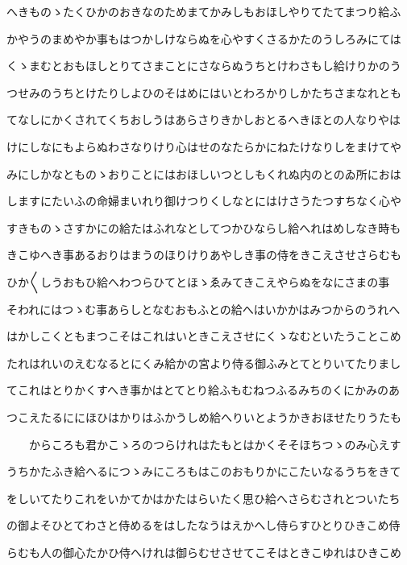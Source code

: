 \documentclass[a4paper,11pt,landscape]{ltjtarticle}
\begin{document}
\par\medskip
へきものゝたくひかのおきなのためまてかみしもおほしやりてたてまつり給ふ
\par\medskip
かやうのまめやか事もはつかしけならぬを心やすくさるかたのうしろみにては
\par\medskip
くゝまむとおもほしとりてさまことにさならぬうちとけわさもし給けりかのう
\par\medskip
つせみのうちとけたりしよひのそはめにはいとわろかりしかたちさまなれとも
\par\medskip
てなしにかくされてくちおしうはあらさりきかしおとるへきほとの人なりやは
\par\medskip
けにしなにもよらぬわさなりけり心はせのなたらかにねたけなりしをまけてや
\par\medskip
みにしかなとものゝおりことにはおほしいつとしもくれぬ内のとのゐ所におは
\par\medskip
しますにたいふの命婦まいれり御けつりくしなとにはけさうたつすちなく心や
\par\medskip
すきものゝさすかにの給たはふれなとしてつかひならし給へれはめしなき時も
\par\medskip
きこゆへき事あるおりはまうのほりけりあやしき事の侍をきこえさせさらむも
\par\medskip
ひか〱しうおもひ給へわつらひてとほゝゑみてきこえやらぬをなにさまの事
\par\medskip
そわれにはつゝむ事あらしとなむおもふとの給へはいかかはみつからのうれへ
\par\medskip
はかしこくともまつこそはこれはいときこえさせにくゝなむといたうことこめ
\par\medskip
たれはれいのえむなるとにくみ給かの宮より侍る御ふみとてとりいてたりまし
\par\medskip
てこれはとりかくすへき事かはとてとり給ふもむねつふるみちのくにかみのあ
\par\medskip
つこえたるににほひはかりはふかうしめ給へりいとようかきおほせたりうたも
\par\medskip
　　からころも君かこゝろのつらけれはたもとはかくそそほちつゝのみ心えす
\par\medskip
うちかたふき給へるにつゝみにころもはこのおもりかにこたいなるうちをきて
\par\medskip
をしいてたりこれをいかてかはかたはらいたく思ひ給へさらむされとついたち
\par\medskip
の御よそひとてわさと侍めるをはしたなうはえかへし侍らすひとりひきこめ侍
\par\medskip
らむも人の御心たかひ侍へけれは御らむせさせてこそはときこゆれはひきこめ
\end{document}
